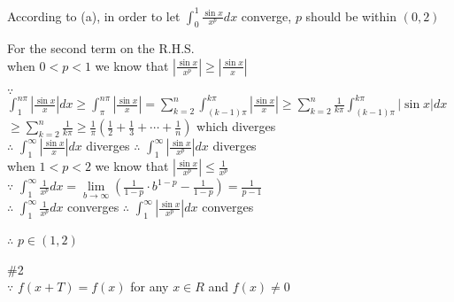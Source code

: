 \documentclass{article}
\begin{document}
According to (a), in order to let $\int_0^1 \frac{\sin{x}}{x^p}dx$ converge, $p$ should be within $(0,2)$\\

\vskip 1cm

For the second term on the R.H.S.\\

when $0<p<1$ \quad we know that $\left|\frac{\sin{x}}{x^p}\right| \geq \left|\frac{\sin{x}}{x}\right|$

\hskip 2.9cm $\because$ \qquad $\displaystyle \int_1^{n\pi} \left|\frac{\sin{x}}{x}\right|dx \geq \int_\pi^{n\pi} \left|\frac{\sin{x}}{x}\right| = \sum \limits_{k=2}^n \int_{(k-1)\pi}^{k\pi} \left|\frac{\sin{x}}{x}\right| \geq \sum \limits_{k = 2}^n \frac{1}{k\pi} \int_{(k-1)\pi}^{k\pi} |\sin{x}|dx$\\

\hskip 6.27cm $\displaystyle \geq \sum \limits_{k=2}^n \frac{1}{k\pi} \geq \frac{1}{\pi}\left(\frac{1}{2} + \frac{1}{3} + \cdots + \frac{1}{n}\right)$ which diverges\\

\hskip 2.9cm $\therefore$ \qquad $\displaystyle \int_1^\infty \left|\frac{\sin{x}}{x}\right|dx$ diverges \qquad $\therefore$ \qquad $\displaystyle \int_1^\infty \left|\frac{\sin{x}}{x^p}\right|dx$ diverges\\

when $1<p<2$ \quad we know that $\left|\frac{\sin{x}}{x^p}\right| \leq \frac{1}{x^p}$\\

\hskip 2.9cm $\because$ \qquad $\displaystyle \int_1^\infty \frac{1}{x^p}dx = \lim \limits_{b \to \infty} \left(\frac{1}{1-p} \cdot b^{1-p} - \frac{1}{1-p}\right) = \frac{1}{p-1}$\\

\hskip 2.9cm $\therefore$ \qquad $\displaystyle \int_1^\infty \frac{1}{x^p}dx$ converges \qquad $\therefore$ \qquad $\displaystyle \int_1^\infty \left|\frac{\sin{x}}{x^p}\right|dx$ converges\\

\vskip 1cm

$\therefore$ \qquad $p \in (1,2)$\\ 

\vskip 3cm

\textcolor[rgb]{0.00,0.00,0.50}{\#2}\\

$\because$ \qquad $f(x+T) = f(x)$ for any $x \in R$ \quad and \quad $f(x) \neq 0$\\
\end{document}
